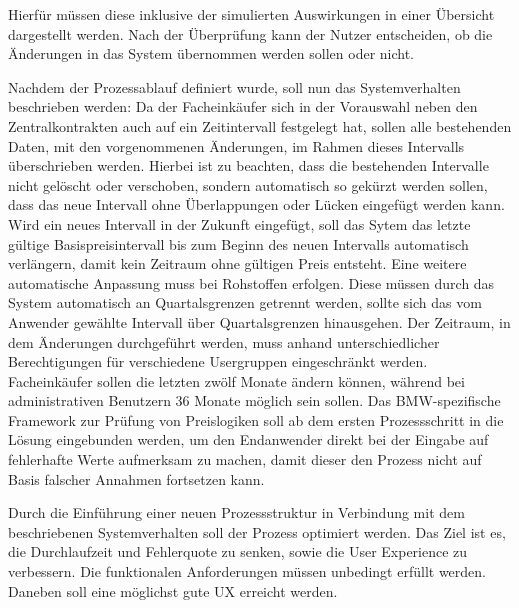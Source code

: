 Hierfür müssen diese inklusive der simulierten Auswirkungen in einer Übersicht dargestellt werden. Nach der Überprüfung kann der Nutzer entscheiden, ob die Änderungen in das System übernommen werden sollen oder nicht.

Nachdem der Prozessablauf definiert wurde, soll nun das Systemverhalten beschrieben werden: Da der Facheinkäufer sich in der Vorauswahl neben den Zentralkontrakten auch auf ein Zeitintervall festgelegt hat, sollen alle bestehenden Daten, mit den vorgenommenen Änderungen, im Rahmen dieses Intervalls überschrieben werden. Hierbei ist zu beachten, dass die bestehenden Intervalle nicht gelöscht oder verschoben, sondern automatisch so gekürzt werden sollen, dass das neue Intervall ohne Überlappungen oder Lücken eingefügt werden kann. Wird ein neues Intervall in der Zukunft eingefügt, soll das Sytem das letzte gültige Basispreisintervall bis zum Beginn des neuen Intervalls automatisch verlängern, damit kein Zeitraum ohne gültigen Preis entsteht. Eine weitere automatische Anpassung muss bei Rohstoffen erfolgen. Diese müssen durch das System automatisch an Quartalsgrenzen getrennt werden, sollte sich das vom Anwender gewählte Intervall über Quartalsgrenzen hinausgehen. Der Zeitraum, in dem Änderungen durchgeführt werden, muss anhand unterschiedlicher Berechtigungen für verschiedene Usergruppen eingeschränkt werden. Facheinkäufer sollen die letzten zwölf Monate ändern können, während bei administrativen Benutzern 36 Monate möglich sein sollen. Das BMW-spezifische Framework zur Prüfung von Preislogiken soll ab dem ersten Prozessschritt in die Lösung eingebunden werden, um den Endanwender direkt bei der Eingabe auf fehlerhafte Werte aufmerksam zu machen, damit dieser den Prozess nicht auf Basis falscher Annahmen fortsetzen kann.

Durch die Einführung einer neuen Prozessstruktur in Verbindung mit dem beschriebenen Systemverhalten soll der Prozess optimiert werden. Das Ziel ist es, die Durchlaufzeit und Fehlerquote zu senken, sowie die User Experience zu verbessern. Die funktionalen Anforderungen müssen unbedingt erfüllt werden. Daneben soll eine möglichst gute UX erreicht werden.